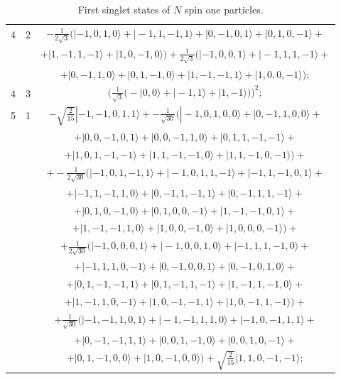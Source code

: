\documentclass[rmp,amsfonts,showpacs,showkeys,preprint]{revtex4}
\begin{document}
\begin{table}
\begin{tabular}{ccc}
4&2&$-\frac{1}{2
{\sqrt{3}}}\big(|-1,0,1,0\rangle+|-1,1,-1,1\rangle+
|0,-1,0,1\rangle+|0,1,0,-1\rangle+$\\&&$+
|1,-1,1,-1\rangle+|1,0,-1,0\rangle\big)+\frac{1}{2
{\sqrt{3}}}\big(|-1,0,0,1\rangle+|-1,1,1,-1\rangle+$\\&&$+
|0,-1,1,0\rangle+|0,1,-1,0\rangle+
|1,-1,-1,1\rangle+|1,0,0,-1\rangle\big);$\\
4&3&$\big(\frac{1}{{\sqrt{3}}}\big(-|0,0\rangle+|-1,1\rangle+|1,-1\rangle\big)\big)^2
;$\\\hline 5&1&$-{\sqrt{\frac{2}{15}}}|-1,-1,0,1,1\rangle+
-\frac{1}{{\sqrt{30}}}\big(|-1,0,1,0,0\rangle+|0,-1,1,0,0\rangle+$\\&&$+
|0,0,-1,0,1\rangle+|0,0,-1,1,0\rangle+
|0,1,1,-1,-1\rangle+$\\&&$+|1,0,1,-1,-1\rangle+
|1,1,-1,-1,0\rangle+|1,1,-1,0,-1\rangle\big)+$\\&&$+ -\frac{1}{2
{\sqrt{30}}}\big(|-1,0,1,-1,1\rangle+|-1,0,1,1,-1\rangle+
|-1,1,-1,0,1\rangle+$\\&&$+|-1,1,-1,1,0\rangle+
|0,-1,1,-1,1\rangle+|0,-1,1,1,-1\rangle+$\\&&$+
|0,1,0,-1,0\rangle+|0,1,0,0,-1\rangle+
|1,-1,-1,0,1\rangle+$\\&&$+|1,-1,-1,1,0\rangle+
|1,0,0,-1,0\rangle+|1,0,0,0,-1\rangle\big)+$\\&&$+ \frac{1}{2
{\sqrt{30}}}\big(|-1,0,0,0,1\rangle+|-1,0,0,1,0\rangle+
|-1,1,1,-1,0\rangle+$\\&&$+|-1,1,1,0,-1\rangle+
|0,-1,0,0,1\rangle+|0,-1,0,1,0\rangle+$\\&&$+
|0,1,-1,-1,1\rangle+|0,1,-1,1,-1\rangle+
|1,-1,1,-1,0\rangle+$\\&&$+|1,-1,1,0,-1\rangle+
|1,0,-1,-1,1\rangle+|1,0,-1,1,-1\rangle\big)+$\\&&$+
\frac{1}{{\sqrt{30}}}\big(|-1,-1,1,0,1\rangle+|-1,-1,1,1,0\rangle+
|-1,0,-1,1,1\rangle+$\\&&$+|0,-1,-1,1,1\rangle+
|0,0,1,-1,0\rangle+|0,0,1,0,-1\rangle+$\\&&$+
|0,1,-1,0,0\rangle+|1,0,-1,0,0\rangle\big)+{\sqrt{\frac{2}{15}}}|1,1,0,-1,-1\rangle;$\\
\hline\hline
\end{tabular}
\caption{First singlet states of $N$ spin one particles.
\label{2005-singlet-t1}}
\end{table}
\end{document}
